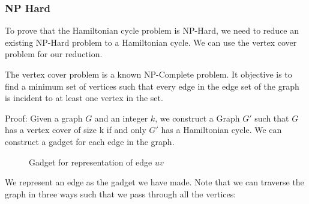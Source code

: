 \begin{itemize}
\subsubsection{NP Hard}

To prove that the Hamiltonian cycle problem is NP-Hard, we need to reduce an existing NP-Hard problem to a  Hamiltonian cycle. We can use the vertex cover problem for our reduction.

The vertex cover problem is a known NP-Complete problem. It objective is to find a minimum set of vertices such that every edge in the edge set of the graph is incident to at least one vertex in the set.

Proof: Given a graph $G$ and an integer $k$, we construct a Graph $G'$ such that $G$ has a vertex cover of size k if and only $G'$ has a Hamiltonian cycle. We can construct a gadget for each edge in the graph.
\begin{figure}
\centering
{}
\caption{Gadget for representation of edge $uv$}
\end{figure}

We represent an edge as the gadget we have made. Note that we can traverse the graph in three ways such that we pass through all the vertices:

\begin{figure}
\centering
\scalebox{0.5}{

\begin{tikzpicture}[-,>=stealth',shorten >=1pt,auto,node distance=3cm,
                    thick,main node/.style={circle,draw,font=\sffamily\Large\bfseries}]


\end{tikzpicture}}
\end{figure}
\end{itemize}
